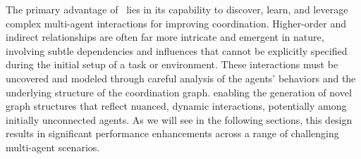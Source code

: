 \noindent The primary advantage of \algoabb\ lies in its capability to discover, learn, and leverage complex multi-agent interactions for improving coordination. Higher-order and indirect relationships are often far more intricate and emergent in nature, involving subtle dependencies and influences that cannot be explicitly specified during the initial setup of a task or environment. These interactions must be uncovered and modeled through careful analysis of the agents’ behaviors and the underlying structure of the coordination graph.  enabling the generation of novel graph structures that reflect nuanced, dynamic interactions, potentially among initially unconnected agents. As we will see in the following sections, this design results in significant performance enhancements across a range of challenging multi-agent scenarios. 


